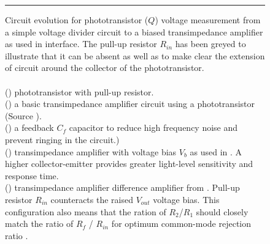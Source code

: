 \begin{figure}
    \centering
    \begin{subfigure}[t]{0.19\textwidth}
        \VDIV[0.9]
        \caption{}
        \label{fig:volt-div}
    \end{subfigure}
    \begin{subfigure}[t]{0.39\textwidth}
        \TIABASIC[0.9]
        \caption{}
        \label{fig:tia-basic}
    \end{subfigure}
    \begin{subfigure}[t]{0.39\textwidth}
        \TIACF[0.9]
        \caption{}
        \label{fig:tia-cf}
    \end{subfigure}

    \vspace{0.5cm}
    \noindent\rule{\textwidth}{0.4pt}
    \vspace{0.5cm}

    \begin{subfigure}[t]{0.45\textwidth}
        \TIAVB[0.9]
        \caption{}
        \label{fig:tia-vb}
        \label{fig:tia-bias}
    \end{subfigure}
    \begin{subfigure}[t]{0.45\textwidth}
        \TIAFULL[0.9]
        \caption{}
        \label{fig:tia-full}
        \label{fig:tia-diff}
        \label{fig:general-tia}
    \end{subfigure}
    \centering
    \caption[Circuit evolution for phototransistor voltage measurement]{Circuit evolution for phototransistor ($Q$) voltage measurement from a
        simple voltage divider circuit to a biased transimpedance amplifier as used
        in \citep{mcpherson_portable_2013} interface. The pull-up resistor $R_{in}$
        has been greyed to illustrate that it can be absent as well as to make clear
        the extension of circuit around the collector of the phototransistor.\\\\
        () phototransistor with pull-up resistor.\\
        () a basic transimpedance amplifier circuit using
        a phototransistor (Source \textcite[Figure 4.22]{horowitz_art_2015}).\\
        () a feedback $C_f$ capacitor to reduce high
        frequency noise and prevent ringing in the circuit.)\\
        () transimpedance amplifier with voltage bias $V_b$
        as used in \textcite{pardue_near_2013}. A higher collector-emitter
        provides greater light-level sensitivity and response time.\\
        () transimpedance amplifier difference amplifier
        from \textcite[Figure 3]{mcpherson_portable_2013}. Pull-up resistor
        $R_{in}$ counteracts the raised $V_{out}$ voltage bias. This
        configuration also means that the ration of $R_2$/$R_1$ should closely
        match the ratio of $R_{f}$ / $R_{in}$ for optimum common-mode rejection
        ratio \cite[p.~227]{horowitz_art_2015}.}
    \label{fig:tia-evolution}
\end{figure}


